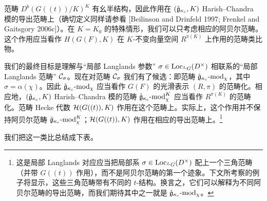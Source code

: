 范畴 $D^b(G((t))/K)^K$ 有幺半结构，因此作用在 $(\hat{\mathfrak{g}}_{\kappa_c},K)$ Harish--Chandra 模的导出范畴上（确切定义同样请参看 [Beilinson and Drinfeld 1997; Frenkel and Gaitsgory 2006c]）。在 $K=K_0$ 的特殊情形，我们可以只考虑相应的阿贝尔范畴。这个作用应当看作 $H(G(F),K)$ 在 $K$-不变向量空间 $R^{\pi(K)}$ 上作用的范畴类比物。

我们的最终目标是理解与“局部 Langlands 参数” $\sigma\in\operatorname{Loc}_{{}^L G}(D^\times)$ 相联系的“局部 Langlands 范畴” $\mathcal{C}_\sigma$。现在对范畴 $\mathcal{C}_\sigma$ 我们有了候选：即范畴 $\hat{\mathfrak{g}}_{\kappa_c}\text{-}\mathrm{mod}_\chi$，其中 $\sigma=\alpha(\chi)$。因此 $\hat{\mathfrak{g}}_{\kappa_c}\text{-}\mathrm{mod}_\chi$ 应当看作 $G(F)$ 的光滑表示 $(R,\pi)$ 的范畴化。相应地，$(\hat{\mathfrak{g}}_{\kappa_c},K)$ Harish--Chandra 模的范畴 $\hat{\mathfrak{g}}_{\kappa_c}\text{-}\mathrm{mod}_\chi^K$ 应当看作 $R^{\pi(K)}$ 的范畴化。范畴 Hecke 代数 $\mathcal{H}(G((t)),K)$ 作用在这个范畴上。实际上，这个作用并不保持阿贝尔范畴 $\hat{\mathfrak{g}}_{\kappa_c}\text{-}\mathrm{mod}_\chi^K$；$\mathcal{H}(G((t)),K)$ 作用在相应的导出范畴上。\footnote{这是局部 Langlands 对应应当把局部系 $\sigma\in\operatorname{Loc}_{{}^L G}(D^\times)$ 配上一个三角范畴（并带 $G((t))$ 作用），而不是阿贝尔范畴的第一个迹象。下文所考察的例子将显示，这些三角范畴带有不同的 $t$-结构。换言之，它们可以解释为不同阿贝尔范畴的导出范畴，而我们期待其中之一就是 $\hat{\mathfrak{g}}_{\kappa_c}\text{-}\mathrm{mod}_\chi$。}

我们把这一类比总结成下表。

